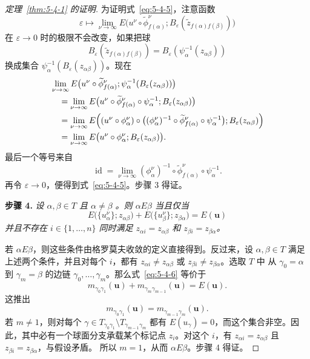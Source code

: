 \begin{proof}[定理~\ref{thm:5-4-1} 的证明]
为证明式~\eqref{eq:5-4-5}，注意函数
\[
  \varepsilon\longmapsto
  \lim_{\nu\to\infty}
  E\bigl(u^\nu\circ\widetilde\phi_{f(\alpha)}^\nu;
    B_\varepsilon(\widetilde z_{f(\alpha)f(\beta)})\bigr)
\]
在 $\varepsilon\to0$ 时的极限不会改变，如果把球
\[
  B_\varepsilon(\widetilde z_{f(\alpha)f(\beta)})
  =B_\varepsilon(\psi_\alpha^{-1}(z_{\alpha\beta}))
\]
换成集合 $\psi_\alpha^{-1}(B_\varepsilon(z_{\alpha\beta}))$。现在
\[
  \begin{aligned}
  &\lim_{\nu\to\infty}
  E\bigl(u^\nu\circ\widetilde\phi_{f(\alpha)}^\nu;
    \psi_\alpha^{-1}(B_\varepsilon(z_{\alpha\beta}))\bigr)\\
  &\quad=\lim_{\nu\to\infty}
  E\bigl(u^\nu\circ\widetilde\phi_{f(\alpha)}^\nu\circ\psi_\alpha^{-1};
    B_\varepsilon(z_{\alpha\beta})\bigr)\\
  &\quad=\lim_{\nu\to\infty}
  E\Bigl((u^\nu\circ\phi_\alpha^\nu)\circ
    \bigl((\phi_\alpha^\nu)^{-1}\circ
      \widetilde\phi_{f(\alpha)}^\nu\circ\psi_\alpha^{-1}\bigr);
    B_\varepsilon(z_{\alpha\beta})\Bigr)\\
  &\quad=\lim_{\nu\to\infty}
  E\bigl(u^\nu\circ\phi_\alpha^\nu;B_\varepsilon(z_{\alpha\beta})\bigr).
  \end{aligned}
\]
最后一个等号来自
\[
  \operatorname{id}
  =\lim_{\nu\to\infty}
  (\phi_\alpha^\nu)^{-1}\circ
  \widetilde\phi_{f(\alpha)}^\nu\circ\psi_\alpha^{-1}.
\]
再令 $\varepsilon\to0$，便得到式~\eqref{eq:5-4-5}。步骤 3 得证。

\medskip
\noindent\textbf{步骤 4.}\quad
\emph{设 $\alpha,\beta\in T$ 且 $\alpha\ne\beta$
。则
$\alpha E\beta$ 当且仅当}
\begin{equation}\label{eq:5-4-6}
  E\bigl(\{u_\alpha^\nu\};z_{\alpha\beta}\bigr)
  +E\bigl(\{u_\beta^\nu\};z_{\beta\alpha}\bigr)
  =E(\mathbf u)
\end{equation}
\emph{并且不存在 $i\in\{1,\ldots,n\}$ 同时满足
$z_{\alpha i}=z_{\alpha\beta}$ 和 $z_{\beta i}=z_{\beta\alpha}$。}

若 $\alpha E\beta$，则这些条件由格罗莫夫收敛的定义直接得到。反过来，设
$\alpha,\beta\in T$ 满足上述两个条件，并且对每个 $i$，都有
$z_{\alpha i}\ne z_{\alpha\beta}$ 或 $z_{\beta i}\ne z_{\beta\alpha}$。选取 $T$ 中
从 $\gamma_0=\alpha$ 到 $\gamma_m=\beta$ 的边链
$\gamma_0,\ldots,\gamma_m$。那么式~\eqref{eq:5-4-6} 等价于
\[
  m_{\gamma_0\gamma_1}(\mathbf u)
  +m_{\gamma_m\gamma_{m-1}}(\mathbf u)=E(\mathbf u).
\]
这推出
\[
  m_{\gamma_0\gamma_1}(\mathbf u)
  =m_{\gamma_{m-1}\gamma_m}(\mathbf u).
\]
若 $m\ne1$，则对每个
$\gamma\in T_{\gamma_0\gamma_1}\setminus T_{\gamma_{m-1}\gamma_m}$ 都有
$E(u_\gamma)=0$，而这个集合非空。因此，其中必有一个球面分支承载某个标记点
$z_i$。对这个 $i$，有
$z_{\alpha i}=z_{\alpha\beta}$ 且 $z_{\beta i}=z_{\beta\alpha}$，与假设矛盾。
所以 $m=1$，从而 $\alpha E\beta$。步骤 4 得证。


\end{proof}
